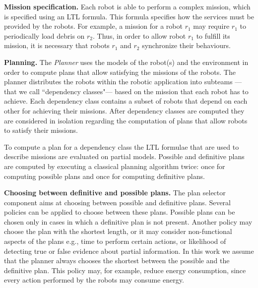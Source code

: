 \textbf{Mission specification.}
Each robot is able to perform a complex mission, which is specified using an LTL formula.
This formula specifies how the services must be provided by the robots.
For example, a mission for a robot $r_1$ may require $r_1$ to  periodically load debris on $r_2$.
Thus, in order to allow robot $r_1$ to fulfill its mission, it is necessary that robots $r_1$ and $r_2$ synchronize their behaviours.





\textbf{Planning.} 
The \emph{Planner} uses the models of the robot(s) and the environment in order to compute plans that allow satisfying the missions of the robots.
The planner distributes the robots within the robotic application into subteams ---that we call ``dependency classes"--- based on the mission that each robot has to achieve.
Each dependency class contains a subset of robots that depend on each other for achieving their missions.
After  dependency classes are computed they are considered in isolation regarding the computation of plans that allow robots to satisfy their missions.

To compute a plan for a dependency class the  LTL formulae that are used to describe missions are evaluated on partial models.
Possible and definitive plans are computed by executing a classical planning algorithm twice: once for computing possible plans and once for computing definitive plans.



\textbf{Choosing between definitive and possible plans.}
The plan selector component aims at choosing between possible and definitive plans.
Several policies can be applied to choose between these plans.
Possible plans can be chosen only in cases in which a definitive plan is  not present.
Another policy may choose the plan with the shortest length, or it may consider non-functional aspects of the plans e.g., time to perform certain actions, or likelihood of detecting true or false evidence about partial information. 
In this work we assume  that the planner always chooses the shortest between the possible and the definitive plan.
This policy may, for example, reduce energy consumption, since every action performed by the robots may consume energy. 

